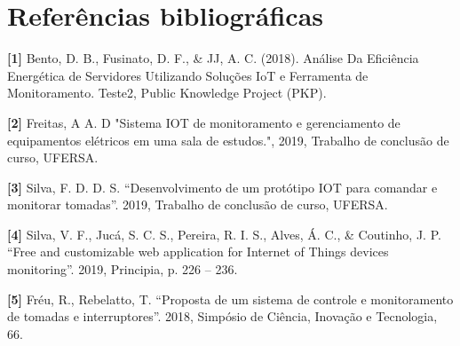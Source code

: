 \chapter{Referências bibliográficas}\label{CAP:introducao}

\noindent \textbf{[1]} Bento, D. B., Fusinato, D. F., & JJ, A. C. (2018). Análise Da Eficiência Energética de Servidores Utilizando Soluções IoT e Ferramenta de Monitoramento. Teste2, Public Knowledge Project (PKP).

\noindent \textbf{[2]} Freitas, A A. D "Sistema IOT de monitoramento e gerenciamento de equipamentos elétricos em uma sala de estudos.", 2019, Trabalho de conclusão de curso, UFERSA.

\noindent \textbf{[3]} Silva, F. D. D. S. “Desenvolvimento de um protótipo IOT para comandar e monitorar tomadas”. 2019, Trabalho de conclusão de curso, UFERSA.

\noindent \textbf{[4]} Silva, V. F., Jucá, S. C. S., Pereira, R. I. S., Alves, Á. C., & Coutinho, J. P. “Free and customizable web application for Internet of Things devices monitoring”. 2019, Principia, p. 226 – 236.

\noindent \textbf{[5]} Fréu, R., Rebelatto, T. “Proposta de um sistema de controle e monitoramento de tomadas e interruptores”. 2018, Simpósio de Ciência, Inovação e Tecnologia, 66.
\newpage